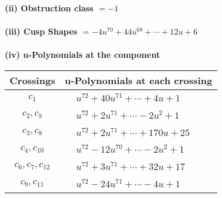 \documentclass[1p]{elsarticle_modified}
\theoremstyle{definition}
\begin{document}
\flushleft \textbf{(ii) Obstruction class $= -1$}\\~\\
\flushleft \textbf{(iii) Cusp Shapes $= -4 u^{70}+44 u^{68}+\cdots+12 u+6$}\\~\\
\newpage\renewcommand{\arraystretch}{1}
\flushleft \textbf{(iv) u-Polynomials at the component}\newline \\
\begin{tabular}{m{50pt}|m{274pt}}
Crossings & \hspace{64pt}u-Polynomials at each crossing \\
\hline $$\begin{aligned}c_{1}\end{aligned}$$&$\begin{aligned}
&u^{72}+40 u^{71}+\cdots+4 u+1
\end{aligned}$\\
\hline $$\begin{aligned}c_{2},c_{5}\end{aligned}$$&$\begin{aligned}
&u^{72}+2 u^{71}+\cdots-2 u^2+1
\end{aligned}$\\
\hline $$\begin{aligned}c_{3},c_{8}\end{aligned}$$&$\begin{aligned}
&u^{72}+2 u^{71}+\cdots+170 u+25
\end{aligned}$\\
\hline $$\begin{aligned}c_{4},c_{10}\end{aligned}$$&$\begin{aligned}
&u^{72}-12 u^{70}+\cdots-2 u^2+1
\end{aligned}$\\
\hline $$\begin{aligned}c_{6},c_{7},c_{12}\end{aligned}$$&$\begin{aligned}
&u^{72}+3 u^{71}+\cdots+32 u+17
\end{aligned}$\\
\hline $$\begin{aligned}c_{9},c_{11}\end{aligned}$$&$\begin{aligned}
&u^{72}-24 u^{71}+\cdots-4 u+1
\end{aligned}$\\
\hline
\end{tabular}\\~\\
\end{document}

